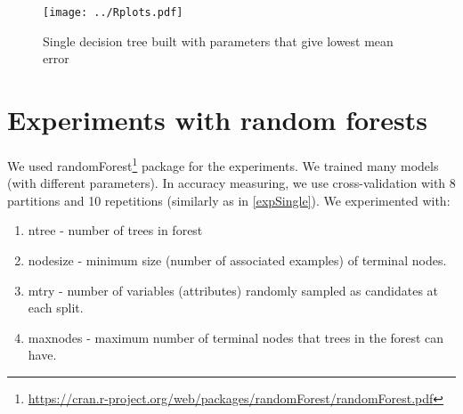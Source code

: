 \documentclass[a4paper]{article}
\begin{document}
\begin{figure}[!hbt]
    \centering
    \texttt{[image: ../Rplots.pdf]}
    \caption[]{Single decision tree built with parameters that give lowest mean error
    \label{fig:single}
    }
\end{figure}

% 
% 
% 
\section{Experiments with random forests}
\label{forest}
We used randomForest\footnote{\url{https://cran.r-project.org/web/packages/randomForest/randomForest.pdf}} package for the experiments.
We trained many models (with different parameters).
In accuracy measuring, we use cross-validation with 8 partitions
and 10 repetitions (similarly as in \ref{expSingle}).
We experimented with:
\begin{enumerate}
    \item ntree - number of trees in forest
    \item nodesize - minimum size (number of associated examples) of terminal nodes.
    \item mtry - number of variables (attributes) randomly sampled as candidates at each split.
    \item maxnodes - maximum number of terminal nodes that trees in the forest can have.
\end{enumerate}
\end{document}
